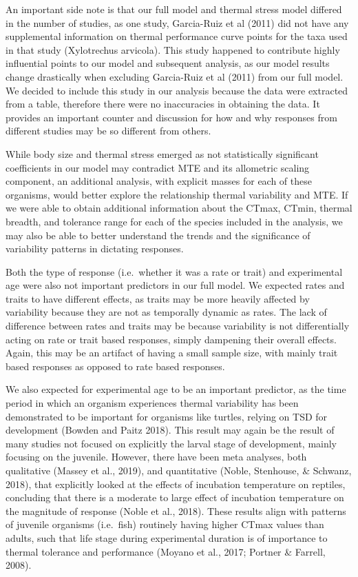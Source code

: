\documentclass[12pt,twoside]{reedthesis}
\begin{document}
An important side note is that our full model and thermal stress model differed in the number of studies, as one study, Garcia-Ruiz et al (2011) did not have any supplemental information on thermal performance curve points for the taxa used in that study (Xylotrechus arvicola). This study happened to contribute highly influential points to our model and subsequent analysis, as our model results change drastically when excluding Garcia-Ruiz et al (2011) from our full model. We decided to include this study in our analysis because the data were extracted from a table, therefore there were no inaccuracies in obtaining the data. It provides an important counter and discussion for how and why responses from different studies may be so different from others.

While body size and thermal stress emerged as not statistically significant coefficients in our model may contradict MTE and its allometric scaling component, an additional analysis, with explicit masses for each of these organisms, would better explore the relationship thermal variability and MTE. If we were able to obtain additional information about the CTmax, CTmin, thermal breadth, and tolerance range for each of the species included in the analysis, we may also be able to better understand the trends and the significance of variability patterns in dictating responses.

Both the type of response (i.e.~whether it was a rate or trait) and experimental age were also not important predictors in our full model. We expected rates and traits to have different effects, as traits may be more heavily affected by variability because they are not as temporally dynamic as rates. The lack of difference between rates and traits may be because variability is not differentially acting on rate or trait based responses, simply dampening their overall effects. Again, this may be an artifact of having a small sample size, with mainly trait based responses as opposed to rate based responses.

We also expected for experimental age to be an important predictor, as the time period in which an organism experiences thermal variability has been demonstrated to be important for organisms like turtles, relying on TSD for development (Bowden and Paitz 2018). This result may again be the result of many studies not focused on explicitly the larval stage of development, mainly focusing on the juvenile. However, there have been meta analyses, both qualitative (Massey et al., 2019), and quantitative (Noble, Stenhouse, \& Schwanz, 2018), that explicitly looked at the effects of incubation temperature on reptiles, concluding that there is a moderate to large effect of incubation temperature on the magnitude of response (Noble et al., 2018). These results align with patterns of juvenile organisms (i.e.~fish) routinely having higher CTmax values than adults, such that life stage during experimental duration is of importance to thermal tolerance and performance (Moyano et al., 2017; Portner \& Farrell, 2008).
\end{document}
